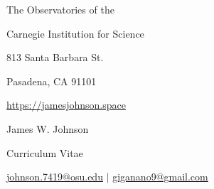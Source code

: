 \documentclass[cv.tex]{subfiles}
\begin{document}
\begin{center}
\parbox{.35\textwidth}{%
	\raggedleft%
	\vspace{-1.5cm}%
	The Observatories of the \par
	Carnegie Institution for Science \par
	813 Santa Barbara St. \par
	Pasadena, CA 91101 \par
	\url{https://jamesjohnson.space}%
}%
\hspace{4mm}%
\vrule height 2.0cm width 0.4pt%
\hspace{4mm}%
\parbox{.5\textwidth}{%
	{%
	\vspace{-1.5cm}%
	\fontsize{30}{36} \selectfont James W. Johnson \par
	\fontsize{20}{25} \selectfont Curriculum Vitae \par
	\fontsize{11}{13} \selectfont%
	\vspace{0.08cm}%
	\href{mailto:johnson.7419@osu.edu}{johnson.7419@osu.edu}%
	\hspace{3mm}%
	$\vert$%
	\hspace{3mm}%
	\href{mailto:giganano9@gmail.com}{giganano9@gmail.com}%
	}%
}%
\end{center}
\end{document}
